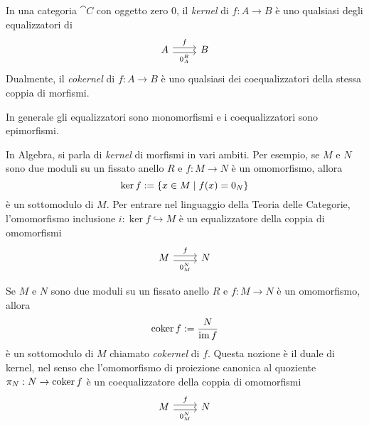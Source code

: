 \begin{definition}
  In una categoria \(\cat C\) con oggetto zero \(0\), il {\em kernel} di
  \(f : A \to B\) è uno qualsiasi degli equalizzatori di
  \[
    \begin{tikzcd}
      A \ar["f", shift left, r] \ar["{0_A^B}", shift right, swap, r] & B
    \end{tikzcd}
  \]
  Dualmente, il {\em cokernel} di \(f : A \to B\) è uno qualsiasi dei
  coequalizzatori della stessa coppia di morfismi.
\end{definition}

\begin{remark}
  In generale gli equalizzatori sono monomorfismi e i
  coequalizzatori sono epimorfismi.
\end{remark}

\begin{example}\label{example:KernelInModR}
  In Algebra, si parla di {\em kernel} di morfismi in vari ambiti. Per
  esempio, se \(M\) e \(N\) sono due moduli su un fissato anello \(R\) e
  \(f : M \to N\) è un omomorfismo, allora
  \[
    \ker f := \left\{x \in M \mid f(x) = 0_N\right\}
  \]
  è un sottomodulo di \(M\). Per entrare nel linguaggio della {\sc
    Teoria delle Categorie}, l'omomorfismo inclusione
  \(i : \ker f \hookrightarrow M\) è un equalizzatore della coppia di omomorfismi
  \[
    \begin{tikzcd}
      M \ar["f", shift left, r] \ar["{0_M^N}", shift right, swap, r] & N
    \end{tikzcd}
  \]
\end{example}

\begin{example}\label{example:CokernelInModR}
  Se \(M\) e \(N\) sono due moduli su un fissato anello \(R\) e
  \(f : M \to N\) è un omomorfismo, allora
  \[
    \operatorname{coker} f := \frac{N}{\operatorname{im} f}
  \]
  è un sottomodulo di \(M\) chiamato {\em cokernel} di \(f\). Questa
  nozione è il duale di kernel, nel senso che l'omomorfismo di
  proiezione canonica al quoziente \(\pi_N : N \to \operatorname{coker} f\) è un
  coequalizzatore della coppia di omomorfismi
  \[
    \begin{tikzcd}
      M \ar["f", shift left, r] \ar["{0_M^N}", shift right, swap, r] & N
    \end{tikzcd}
  \]
\end{example}

